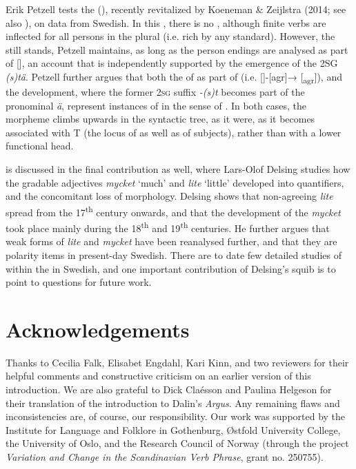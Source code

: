 \documentclass[output=paper]{langscibook}
\begin{document}
Erik Petzell tests the  (), recently revitalized by Koeneman \& Zeijlstra (2014; see also \citealt{Tvica2017}), on data from  Swedish. In this , there is no  , although finite verbs are inflected for all persons in the plural (i.e. rich  by any standard). However, the  still stands, Petzell maintains, as long as the person endings are analysed as part of [], an account that is independently supported by the emergence of the 2SG  \textit{(s)tä}. Petzell further argues that both the  of  as part of  (i.e. []-[agr]→ [\textsubscript{agr}]), and the  development, where the former \textsc{2sg} suffix \textit{{}-(s)t} becomes part of the pronominal  \textit{ä}, represent instances of  in the sense of \citet{RobertsRoussou1999, RobertsRoussou2003}. In both cases, the  morpheme climbs upwards in the syntactic tree, as it were, as it becomes associated with T (the locus of  as well as of subjects), rather than with a lower functional head.



 is discussed in the final contribution as well, where Lars-Olof Delsing studies how the gradable adjectives \textit{mycket} ‘much’ and \textit{lite} ‘little’ developed into quantifiers, and the concomitant loss of  morphology. Delsing shows that non-agreeing \textit{lite} spread from the 17\textsuperscript{th} century onwards, and that the development of the  \textit{mycket} took place mainly during the 18\textsuperscript{th} and 19\textsuperscript{th} centuries. He further argues that weak forms of \textit{lite} and \textit{mycket} have been reanalysed further, and that they are polarity items in present-day Swedish. There are to date few detailed studies of  within the  in Swedish, and one important contribution of Delsing’s squib is to point to questions for future work.


\section*{Acknowledgements}


Thanks to Cecilia Falk, Elisabet Engdahl, Kari Kinn, and two reviewers for their helpful comments and constructive criticism on an earlier version of this introduction. We are also grateful to Dick Claésson and Paulina Helgeson for their translation of the introduction to Dalin’s \textit{Argus}. Any remaining flaws and inconsistencies are, of course, our responsibility. Our work was supported by the Institute for Language and Folklore in Gothenburg, Østfold University College, the University of Oslo, and the Research Council of Norway (through the project \textit{Variation and Change in the Scandinavian Verb Phrase}, grant no. 250755).
\end{document}

